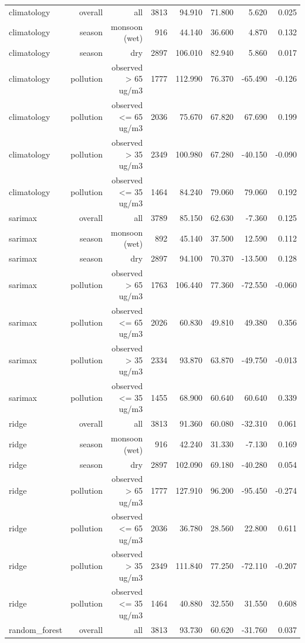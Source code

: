 \begin{table}[htbp]
\begin{tabular}{lrrrrrrr}
climatology & overall & all & 3813 & 94.910 & 71.800 & 5.620 & 0.025 \\
climatology & season & monsoon (wet) & 916 & 44.140 & 36.600 & 4.870 & 0.132 \\
climatology & season & dry & 2897 & 106.010 & 82.940 & 5.860 & 0.017 \\
climatology & pollution & observed > 65 ug/m3 & 1777 & 112.990 & 76.370 & -65.490 & -0.126 \\
climatology & pollution & observed <= 65 ug/m3 & 2036 & 75.670 & 67.820 & 67.690 & 0.199 \\
climatology & pollution & observed > 35 ug/m3 & 2349 & 100.980 & 67.280 & -40.150 & -0.090 \\
climatology & pollution & observed <= 35 ug/m3 & 1464 & 84.240 & 79.060 & 79.060 & 0.192 \\
sarimax & overall & all & 3789 & 85.150 & 62.630 & -7.360 & 0.125 \\
sarimax & season & monsoon (wet) & 892 & 45.140 & 37.500 & 12.590 & 0.112 \\
sarimax & season & dry & 2897 & 94.100 & 70.370 & -13.500 & 0.128 \\
sarimax & pollution & observed > 65 ug/m3 & 1763 & 106.440 & 77.360 & -72.550 & -0.060 \\
sarimax & pollution & observed <= 65 ug/m3 & 2026 & 60.830 & 49.810 & 49.380 & 0.356 \\
sarimax & pollution & observed > 35 ug/m3 & 2334 & 93.870 & 63.870 & -49.750 & -0.013 \\
sarimax & pollution & observed <= 35 ug/m3 & 1455 & 68.900 & 60.640 & 60.640 & 0.339 \\
ridge & overall & all & 3813 & 91.360 & 60.080 & -32.310 & 0.061 \\
ridge & season & monsoon (wet) & 916 & 42.240 & 31.330 & -7.130 & 0.169 \\
ridge & season & dry & 2897 & 102.090 & 69.180 & -40.280 & 0.054 \\
ridge & pollution & observed > 65 ug/m3 & 1777 & 127.910 & 96.200 & -95.450 & -0.274 \\
ridge & pollution & observed <= 65 ug/m3 & 2036 & 36.780 & 28.560 & 22.800 & 0.611 \\
ridge & pollution & observed > 35 ug/m3 & 2349 & 111.840 & 77.250 & -72.110 & -0.207 \\
ridge & pollution & observed <= 35 ug/m3 & 1464 & 40.880 & 32.550 & 31.550 & 0.608 \\
random\_forest & overall & all & 3813 & 93.730 & 60.620 & -31.760 & 0.037 \\

\end{tabular}
\end{table}
